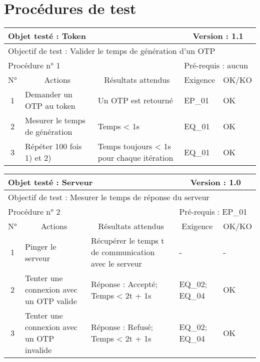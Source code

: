 \documentclass{"../../res/univ-projet"}
\begin{document}
  \section{Procédures de test}  
  \begin{center}
    \vfill
    \begin{tabular}{|c|p{5cm}|p{5cm}|p{1.5cm}|p{1.5cm}|}
      \hline
      \multicolumn{3}{|l|}{Objet testé : Token} & \multicolumn{2}{c|}{Version : 1.1}\\ \hline
      \multicolumn{5}{|l|}{Objectif de test : Valider le temps de génération d'un OTP}\\ \hline
      \multicolumn{3}{|l|}{Procédure n° 1} & \multicolumn{2}{p{3cm}|}{Pré-requis : aucun}\\ \hline
      \multicolumn{1}{|c|}{N°} & \multicolumn{1}{c|}{Actions} & \multicolumn{1}{c|}{Résultats attendus} & 
      \multicolumn{1}{c|}{Exigence} & \multicolumn{1}{c|}{OK/KO}\\ \hline
      1 & Demander un OTP au token & Un OTP est retourné & EP\_01 & OK\\
      2 & Mesurer le temps de génération & Temps < 1s & EQ\_01 & OK\\
      3 & Répéter 100 fois 1) et 2) & Temps toujours < 1s pour chaque itération & EQ\_01 & OK\\ \hline
    \end{tabular}
    \vfill
    
    \begin{tabular}{|c|p{5cm}|p{5cm}|p{1.5cm}|p{1.5cm}|}
      \hline
      \multicolumn{3}{|l|}{Objet testé : Serveur} & \multicolumn{2}{c|}{Version : 1.0}\\ \hline
      \multicolumn{5}{|l|}{Objectif de test : Mesurer le temps de réponse du serveur}\\ \hline
      \multicolumn{3}{|l|}{Procédure n° 2} & \multicolumn{2}{p{3cm}|}{Pré-requis : EP\_01}\\ \hline
      \multicolumn{1}{|c|}{N°} & \multicolumn{1}{c|}{Actions} & \multicolumn{1}{c|}{Résultats attendus} & 
      \multicolumn{1}{c|}{Exigence} & \multicolumn{1}{c|}{OK/KO}\\ \hline
      1 & Pinger le serveur & Récupérer le temps t de communication avec le serveur & - & - \\
      2 & Tenter une connexion avec un OTP valide & Réponse : Accepté; Temps < 2t + 1s & EQ\_02; EQ\_04 &  OK \\
      3 & Tenter une connexion avec un OTP invalide & Réponse : Refusé; Temps < 2t + 1s & EQ\_02; EQ\_04 & OK\\ \hline
    \end{tabular}
    \vfill
    

\end{center}
\end{document}
